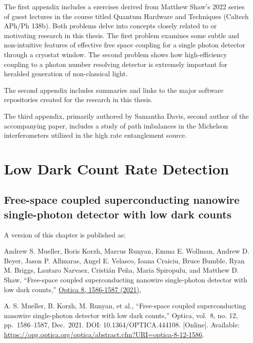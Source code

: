 \documentclass[11pt]{caltech_thesis} %
\begin{document}
The first appendix includes a ezercises derived from Matthew Shaw's 2022 series of guest lectures in the course titled Quantum Hardware and Techniques (Caltech APh/Ph 138b). Both problems delve into concepts closely related to or motivating research in this thesis. The first problem examines some subtle and non-intuitive features of effective free space coupling for a single photon detector through a cryostat window. The second problem shows how high-efficiency coupling to a photon number resolving detector is extremely important for heralded generation of non-classical light.

The second appendix includes summaries and links to the major software repositories created for the research in this thesis.

The third appendix, primarily authored by Samantha Davis, second author of the accompanying paper, includes a study of path imbalances in the Michelson interferometers utilized in the high rate entanglement source.

\hypertarget{low-dark-count-rate-detection}{%
\chapter{Low Dark Count Rate Detection}\label{low-dark-count-rate-detection}}

\hypertarget{free-space-coupled-superconducting-nanowire-single-photon-detector-with-low-dark-counts}{%
\section{Free-space coupled superconducting nanowire single-photon detector with low dark counts}\label{free-space-coupled-superconducting-nanowire-single-photon-detector-with-low-dark-counts}}

A version of this chapter is published as:

Andrew S. Mueller, Boris Korzh, Marcus Runyan, Emma E. Wollman, Andrew D. Beyer, Jason P. Allmaras, Angel E. Velasco, Ioana Craiciu, Bruce Bumble, Ryan M. Briggs, Lautaro Narvaez, Cristián Peña, Maria Spiropulu, and Matthew D. Shaw, ``Free-space coupled superconducting nanowire single-photon detector with low dark counts,'' \href{https://opg.optica.org/optica/fulltext.cfm?uri=optica-8-12-1586\&id=465726}{Optica 8, 1586-1587 (2021)},

A. S. Mueller, B. Korzh, M. Runyan, et al., ``Free-space coupled superconducting nanowire single-photon detector with low dark counts,'' Optica, vol.~8, no. 12, pp.~1586--1587, Dec.~2021. DOI: 10.1364/OPTICA.444108. {[}Online{]}. Available: \url{https://opg.optica.org/optica/abstract.cfm?URI=optica-8-12-1586}.
\end{document}

